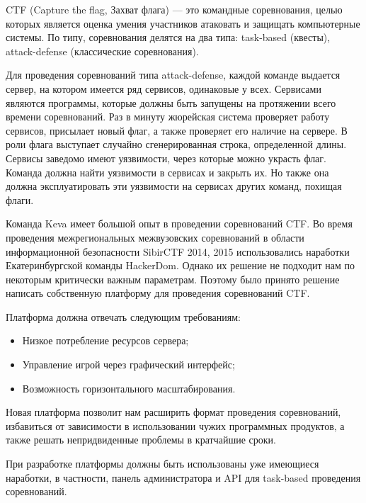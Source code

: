 CTF (Capture the flag, Захват флага) --- это командные соревнования, целью которых является оценка умения участников атаковать и защищать компьютерные системы. По типу, соревнования делятся на два типа: task-based (квесты), attack-defense (классические соревнования).

Для проведения соревнований типа attack-defense, каждой команде выдается сервер, на котором имеется ряд сервисов, одинаковые у всех. Сервисами являются программы, которые должны быть запущены на протяжении всего времени соревнований. Раз в минуту жюрейская система проверяет работу сервисов, присылает новый флаг, а также проверяет его наличие на сервере. В роли флага выступает случайно сгенерированная строка, определенной длины. Сервисы заведомо имеют уязвимости, через которые можно украсть флаг. Команда должна найти уязвимости в сервисах и закрыть их. Но также она должна эксплуатировать эти уязвимости на сервисах других команд, похищая флаги. 

Команда Keva имеет большой опыт в проведении соревнований CTF. Во время проведения межрегиональных межвузовских соревнований в области информационной безопасности SibirCTF 2014, 2015 использовались наработки Екатеринбургской команды HackerDom. Однако их решение не подходит нам по некоторым критически важным параметрам. Поэтому  было принято решение написать собственную платформу для проведения соревнований CTF.

Платформа должна отвечать следующим требованиям:
\begin{itemize}
\item Низкое потребление ресурсов сервера;
\item Управление игрой через графический интерфейс;
\item Возможность горизонтального масштабирования.
\end{itemize}

Новая платформа позволит нам расширить формат проведения соревнований, избавиться от зависимости в использовании чужих программных продуктов, а также решать непридвиденные проблемы в кратчайшие сроки.

При разработке платформы должны быть использованы уже имеющиеся наработки, в частности, панель администратора и API для task-based проведения соревнований. 
